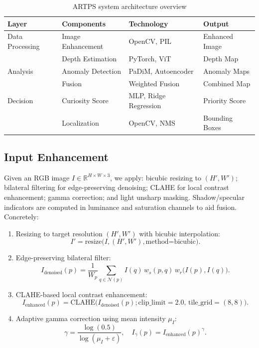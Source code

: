 \documentclass[12pt]{article}
\begin{document}
\begin{table}[h]
\centering
\begin{tabular}{|l|l|l|l|}
\hline
\textbf{Layer} & \textbf{Components} & \textbf{Technology} & \textbf{Output} \\
\hline
Data Processing & Image Enhancement & OpenCV, PIL & Enhanced Image \\
& Depth Estimation & PyTorch, ViT & Depth Map \\
\hline
Analysis & Anomaly Detection & PaDiM, Autoencoder & Anomaly Maps \\
& Fusion & Weighted Fusion & Combined Map \\
\hline
Decision & Curiosity Score & MLP, Ridge Regression & Priority Score \\
& Localization & OpenCV, NMS & Bounding Boxes \\
\hline
\end{tabular}
\caption{ARTPS system architecture overview}
\end{table}

\subsection{Input Enhancement}
Given an RGB image $I\in\mathbb{R}^{H\times W\times 3}$, we apply: bicubic resizing to $(H',W')$; bilateral filtering for edge-preserving denoising; CLAHE for local contrast enhancement; gamma correction; and light unsharp masking. Shadow/specular indicators are computed in luminance and saturation channels to aid fusion. Concretely:

\begin{enumerate}
  \item Resizing to target resolution $(H',W')$ with bicubic interpolation:
  \[ I' = \mathrm{resize}\big(I,(H',W'), \text{method=bicubic}\big). \]
  \item Edge-preserving bilateral filter:
  \[ I_{\text{denoised}}(p) = \frac{1}{W_p} \sum_{q\in\mathcal{N}(p)} I(q)\, w_s(p,q)\, w_r\big(I(p),I(q)\big). \]
  \item CLAHE-based local contrast enhancement:
  \[ I_{\text{enhanced}}(p) = \mathrm{CLAHE}\big(I_{\text{denoised}}(p); \mathrm{clip\_limit}=2.0,\, \mathrm{tile\_grid}=(8,8)\big). \]
  \item Adaptive gamma correction using mean intensity $\mu_I$:
  \[ \gamma = \frac{\log(0.5)}{\log(\mu_I+\varepsilon)},\quad I_{\gamma}(p) = I_{\text{enhanced}}(p)^{\gamma}. \]
\end{enumerate}
\end{document}
